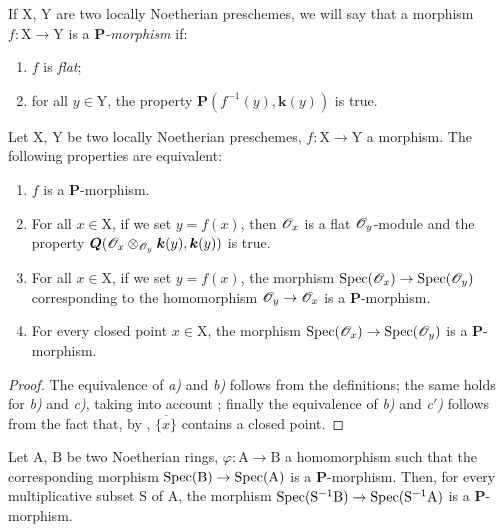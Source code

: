 
If $\mathrm{X}$, $\mathrm{Y}$ are two locally Noetherian preschemes, we will say that a morphism $f:\mathrm{X}\to\mathrm{Y}$ is a \emph{$\boldsymbol{P}$-morphism} if:
\begin{enumerate}[label=\arabic{enumi}\textsuperscript{o}]
  \item $f$ is \emph{flat};
  \item for all $y\in\mathrm{Y}$, the property $\boldsymbol{P}(f^{-1}(y),\boldsymbol{k}(y))$ is true.
\end{enumerate}

\begin{lemma}[7.3.2]
\label{IV.7.3.2}
Let $\mathrm{X}$, $\mathrm{Y}$ be two locally Noetherian preschemes, $f:\mathrm{X}\to\mathrm{Y}$ a morphism.
The following properties are equivalent:
\begin{enumerate}[label=\emph{\alph*)}]
  \item $f$ is a $\boldsymbol{P}$-morphism.
  \item For all $x\in\mathrm{X}$, if we set $y=f(x)$, then $\mathscr{O}_x$ is a flat $\mathscr{O}_y$-module and the property $\boldsymbol{Q}(\mathscr{O}_x\otimes_{\mathscr{O}_y}\boldsymbol{k}(y),\boldsymbol{k}(y))$ is true.
  \item For all $x\in\mathrm{X}$, if we set $y=f(x)$, the morphism $\operatorname{Spec}(\mathscr{O}_x)\to\operatorname{Spec}(\mathscr{O}_y)$ corresponding to the homomorphism $\mathscr{O}_y\to\mathscr{O}_x$ is a $\boldsymbol{P}$-morphism.
  \item[\emph{c$'$)}] For every closed point $x\in\mathrm{X}$, the morphism $\operatorname{Spec}(\mathscr{O}_x)\to\operatorname{Spec}(\mathscr{O}_y)$ is a $\boldsymbol{P}$-morphism.
\end{enumerate}
\end{lemma}

\begin{proof}
The equivalence of \emph{a)} and \emph{b)} follows from the definitions; the same holds for \emph{b)} and \emph{c)}, taking into account ; finally the equivalence of \emph{b)} and \emph{c$'$)} follows from the fact that, by , $\overline{\{x\}}$ contains a closed point.
\end{proof}

\begin{corollary}[7.3.3]
\label{IV.7.3.3}
Let $\mathrm{A}$, $\mathrm{B}$ be two Noetherian rings, $\varphi:\mathrm{A}\to\mathrm{B}$ a homomorphism such that the corresponding morphism $\operatorname{Spec}(\mathrm{B})\to\operatorname{Spec}(\mathrm{A})$ is a $\boldsymbol{P}$-morphism.
Then, for every multiplicative subset $\mathrm{S}$ of $\mathrm{A}$, the morphism $\operatorname{Spec}(\mathrm{S}^{-1}\mathrm{B})\to\operatorname{Spec}(\mathrm{S}^{-1}\mathrm{A})$ is a $\boldsymbol{P}$-morphism.
\end{corollary}

